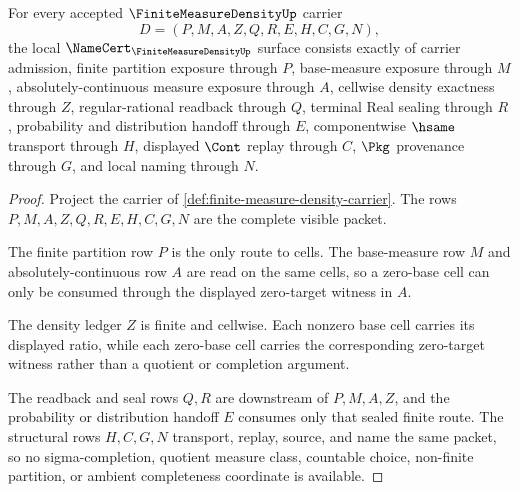 \begin{theorem}
\label{thm:finite-measure-density-namecert-obligations}
For every accepted $\FiniteMeasureDensityUp$ carrier
$$
D=(P,M,A,Z,Q,R,E,H,C,G,N),
$$
the local $\NameCert_{\FiniteMeasureDensityUp}$ surface consists exactly of carrier admission, finite partition exposure through $P$, base-measure exposure through $M$, absolutely-continuous measure exposure through $A$, cellwise density exactness through $Z$, regular-rational readback through $Q$, terminal Real sealing through $R$, probability and distribution handoff through $E$, componentwise $\hsame$ transport through $H$, displayed $\Cont$ replay through $C$, $\Pkg$ provenance through $G$, and local naming through $N$.
\end{theorem}
\begin{proof}
Project the carrier of \autoref{def:finite-measure-density-carrier}. The rows $P,M,A,Z,Q,R,E,H,C,G,N$ are the complete visible packet.

The finite partition row $P$ is the only route to cells. The base-measure row $M$ and absolutely-continuous row $A$ are read on the same cells, so a zero-base cell can only be consumed through the displayed zero-target witness in $A$.

The density ledger $Z$ is finite and cellwise. Each nonzero base cell carries its displayed ratio, while each zero-base cell carries the corresponding zero-target witness rather than a quotient or completion argument.

The readback and seal rows $Q,R$ are downstream of $P,M,A,Z$, and the probability or distribution handoff $E$ consumes only that sealed finite route. The structural rows $H,C,G,N$ transport, replay, source, and name the same packet, so no sigma-completion, quotient measure class, countable choice, non-finite partition, or ambient completeness coordinate is available.
\end{proof}

